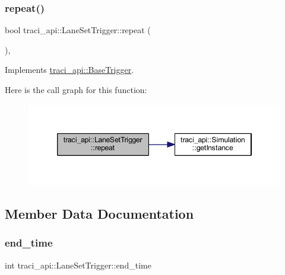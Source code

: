 \subsubsection{\texorpdfstring{repeat()}{repeat()}}
{\footnotesize\ttfamily bool traci\+\_\+api\+::\+Lane\+Set\+Trigger\+::repeat (\begin{DoxyParamCaption}{ }\end{DoxyParamCaption})\hspace{0.3cm}{\ttfamily [override]}, {\ttfamily [virtual]}}



Implements \hyperlink{classtraci__api_1_1_base_trigger_a7d2b1ac3f54e42e71eae69f1c7f33943}{traci\+\_\+api\+::\+Base\+Trigger}.

Here is the call graph for this function\+:\nopagebreak
\begin{figure}[H]
\begin{center}
\leavevmode
\includegraphics[width=346pt]{classtraci__api_1_1_lane_set_trigger_ae606560cb760e12b0f1a86407f614e18_cgraph}
\end{center}
\end{figure}


\subsection{Member Data Documentation}
\mbox{\label{classtraci__api_1_1_lane_set_trigger_a20d2e675f6c1d69246daa42eeac0153c}} 
\subsubsection{\texorpdfstring{end\+\_\+time}{end\_time}}
{\footnotesize\ttfamily int traci\+\_\+api\+::\+Lane\+Set\+Trigger\+::end\+\_\+time}

\mbox{\label{classtraci__api_1_1_lane_set_trigger_ad39b2db18176f0a7d40da0bb3878e519}} 
